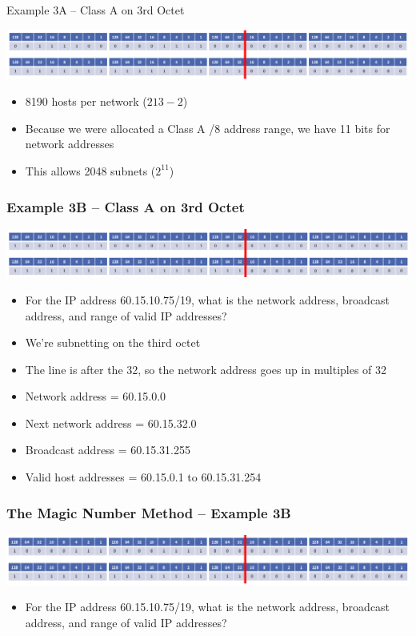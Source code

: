 \documentclass[pdflatex,compress]{beamer}
\begin{document}
\begin{frame}{Example 3A – Class A on 3rd Octet}
	\begin{center}
		\includegraphics[width=\linewidth]{img/img23}
	\end{center}
	\begin{itemize}
		\item 8190 hosts per network ($ 2{13} - 2 $)
		\item Because we were allocated a Class A /8 address range, we have 11 bits for network addresses
		\item This allows 2048 subnets ($ 2^{11} $)
	\end{itemize}
\end{frame}

\begin{frame}
	\frametitle{Example 3B – Class A on 3rd Octet}
	\begin{center}
		\includegraphics[width=\linewidth]{img/img24}
	\end{center}
	\begin{itemize}
		\item<1-> For the IP address 60.15.10.75/19, what is the network address, broadcast address, and range of valid IP addresses?
		\item<2-> We’re subnetting on the third octet
		\item<2-> The line is after the 32, so the network address goes up in multiples of 32
		\item<2-> Network address = 60.15.0.0
		\item<2-> Next network address = 60.15.32.0
		\item<2-> Broadcast address = 60.15.31.255
		\item<2-> Valid host addresses = 60.15.0.1 to 60.15.31.254
	\end{itemize}
\end{frame}

\begin{frame}
	\frametitle{The Magic Number Method – Example 3B}
	\begin{center}
		\includegraphics[width=\linewidth]{img/img25}
	\end{center}
	\begin{itemize}
		\item For the IP address 60.15.10.75/19, what is the network address, broadcast address, and range of valid IP addresses?
	\end{itemize}
\end{frame}
\end{document}

